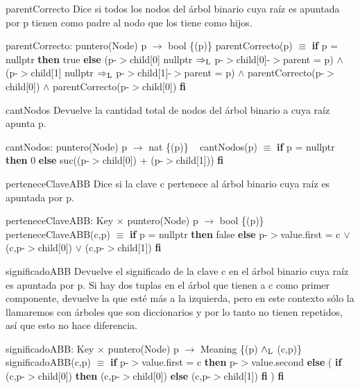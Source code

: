 \begin{DoxyParagraph}{parent\+Correcto}
Dice si todos los nodos del árbol binario cuya raíz es apuntada por p tienen como padre al nodo que los tiene como hijos.

parent\+Correcto\+: puntero(\+Node) p $\to$ bool \{(p)\} parent\+Correcto(p) $\equiv$ {\bfseries if} p = nullptr {\bfseries then} true {\bfseries else} (p-\/$>$child\mbox{[}0\mbox{]}  nullptr $\Rightarrow_{\rm L}$ p-\/$>$child\mbox{[}0\mbox{]}-\/$>$parent = p) $\land$ (p-\/$>$child\mbox{[}1\mbox{]}  nullptr $\Rightarrow_{\rm L}$ p-\/$>$child\mbox{[}1\mbox{]}-\/$>$parent = p) $\land$ parent\+Correcto(p-\/$>$child\mbox{[}0\mbox{]}) $\land$ parent\+Correcto(p-\/$>$child\mbox{[}0\mbox{]}) {\bfseries fi} 


\end{DoxyParagraph}
\begin{DoxyParagraph}{cant\+Nodos}
Devuelve la cantidad total de nodos del árbol binario a cuya raíz apunta p.

cant\+Nodos\+: puntero(\+Node) p $\to$ nat \{(p)\} ~\newline
cant\+Nodos(p) $\equiv$ {\bfseries if} p = nullptr {\bfseries then} 0 {\bfseries else} suc((p-\/$>$child\mbox{[}0\mbox{]}) + (p-\/$>$child\mbox{[}1\mbox{]})) {\bfseries fi} 


\end{DoxyParagraph}
\begin{DoxyParagraph}{pertenece\+Clave\+A\+BB}
Dice si la clave c pertenece al árbol binario cuya raíz es apuntada por p.

pertenece\+Clave\+A\+BB\+: Key $\times$ puntero(\+Node) p $\to$ bool \{(p)\} ~\newline
pertenece\+Clave\+A\+B\+B(c,p) $\equiv$ {\bfseries if} p = nullptr {\bfseries then} false {\bfseries else} p-\/$>$value.\+first = c $\lor$ (c,p-\/$>$child\mbox{[}0\mbox{]}) $\lor$ (c,p-\/$>$child\mbox{[}1\mbox{]}) {\bfseries fi} 


\end{DoxyParagraph}
\begin{DoxyParagraph}{significado\+A\+BB}
Devuelve el significado de la clave c en el árbol binario cuya raíz es apuntada por p. Si hay dos tuplas en el árbol que tienen a c como primer componente, devuelve la que esté más a la izquierda, pero en este contexto sólo la llamaremos con árboles que son diccionarios y por lo tanto no tienen repetidos, así que esto no hace diferencia.

significado\+A\+BB\+: Key $\times$ puntero(\+Node) p $\to$ Meaning \{(p) $\land_{\rm L}$ (c,p)\} ~\newline
significado\+A\+B\+B(c,p) $\equiv$ {\bfseries if} p-\/$>$value.\+first = c {\bfseries then} p-\/$>$value.\+second {\bfseries else} ( {\bfseries if} (c,p-\/$>$child\mbox{[}0\mbox{]}) {\bfseries then} (c,p-\/$>$child\mbox{[}0\mbox{]}) {\bfseries else} (c,p-\/$>$child\mbox{[}1\mbox{]}) {\bfseries fi} ) {\bfseries fi} 


\end{DoxyParagraph}
